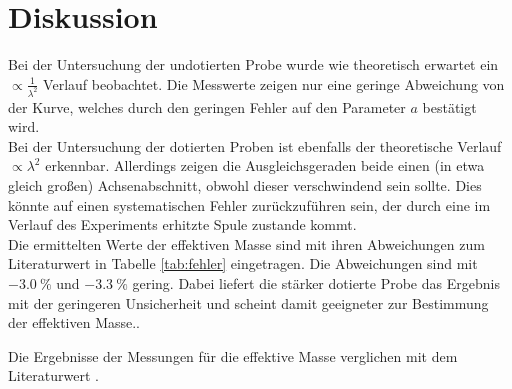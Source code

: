 
\section{Diskussion}
\label{sec:Diskussion}
Bei der Untersuchung der undotierten Probe wurde wie theoretisch erwartet ein $\propto\frac{1}{\lambda^2}$ Verlauf beobachtet. Die Messwerte zeigen nur eine geringe Abweichung von der Kurve, welches durch den geringen Fehler auf den Parameter $a$  bestätigt wird.\\
Bei der Untersuchung der dotierten Proben ist ebenfalls der theoretische Verlauf $\propto\lambda^2$ erkennbar. Allerdings zeigen die Ausgleichsgeraden beide einen (in etwa gleich großen) Achsenabschnitt, obwohl dieser verschwindend sein sollte. Dies könnte auf einen systematischen Fehler zurückzuführen sein, der durch eine im Verlauf des Experiments erhitzte Spule zustande kommt.\\
Die ermittelten Werte der effektiven Masse sind mit ihren Abweichungen zum Literaturwert in Tabelle \ref{tab:fehler} eingetragen. Die Abweichungen sind mit $\SI{-3.0}{\%}$ und $\SI{-3.3}{\%}$ gering. Dabei liefert die stärker dotierte Probe das Ergebnis mit der geringeren Unsicherheit und scheint damit geeigneter zur Bestimmung der effektiven Masse..

\begin{table}
	\centering
	\caption{Die Ergebnisse der Messungen für die effektive Masse verglichen mit dem Literaturwert \cite{litgas}.}
	
	\label{tab:fehler}
\end{table}